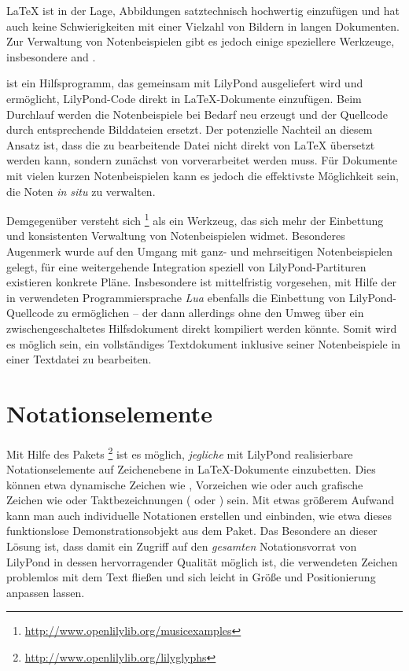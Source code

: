 \documentclass[DIV=12]{scrreprt}
\begin{document}
\LaTeX{} ist in der Lage, Abbildungen satztechnisch hochwertig einzufügen und hat auch keine Schwierigkeiten mit einer Vielzahl von Bildern in langen Dokumenten.
Zur Verwaltung von Notenbeispielen gibt es jedoch einige speziellere Werkzeuge, insbesondere  and .

 ist ein Hilfsprogramm, das gemeinsam mit LilyPond ausgeliefert wird und ermöglicht, LilyPond-Code direkt in \LaTeX-Dokumente einzufügen.
Beim Durchlauf werden die Notenbeispiele bei Bedarf neu erzeugt und der Quellcode durch entsprechende Bilddateien ersetzt.
Der potenzielle Nachteil an diesem Ansatz ist, dass die zu bearbeitende Datei nicht direkt von \LaTeX{} übersetzt werden kann, sondern zunächst von  vorverarbeitet werden muss.
Für Dokumente mit vielen kurzen Notenbeispielen kann es jedoch die effektivste Möglichkeit sein, die Noten \emph{in situ} zu verwalten.

Demgegenüber versteht sich %
\footnote{\url{http://www.openlilylib.org/musicexamples}} 
als ein Werkzeug, das sich mehr der Einbettung und konsistenten Verwaltung von Notenbeispielen widmet.
Besonderes Augenmerk wurde auf den Umgang mit ganz- und mehrseitigen Notenbeispielen gelegt, für eine weitergehende Integration speziell von LilyPond-Partituren existieren konkrete Pläne.
Insbesondere ist mittelfristig vorgesehen, mit Hilfe der in  verwendeten Programmiersprache \emph{Lua} ebenfalls die Einbettung von LilyPond-Quellcode zu ermöglichen -- der dann allerdings ohne den Umweg über ein zwischengeschaltetes Hilfsdokument direkt kompiliert werden könnte.
Somit wird es möglich sein, ein vollständiges Textdokument inklusive seiner Notenbeispiele in einer Textdatei zu bearbeiten.

\section{Notationselemente}
\label{sec:pt_notational-elements}
Mit Hilfe des Pakets \lilyglyphs%
\footnote{\url{http://www.openlilylib.org/lilyglyphs}}
ist es möglich, \emph{jegliche} mit LilyPond realisierbare Notationselemente auf Zeichenebene in \LaTeX-Dokumente einzubetten.
Dies können etwa dynamische Zeichen wie , Vorzeichen wie  \flatflat{} oder auch grafische Zeichen wie \crescHairpin{} oder Taktbezeichnungen ( oder \lilyTimeCHalf) sein.
Mit etwas größerem Aufwand kann man auch individuelle Notationen erstellen und einbinden, wie etwa dieses funktionslose \lilyFancyExample{} Demonstrationsobjekt aus dem Paket.
Das Besondere an dieser Lösung ist, dass damit ein Zugriff auf den \emph{gesamten} Notationsvorrat von LilyPond in dessen hervorragender Qualität möglich ist, die verwendeten Zeichen problemlos mit dem Text fließen und sich leicht in Größe und Positionierung anpassen lassen.
\end{document}
